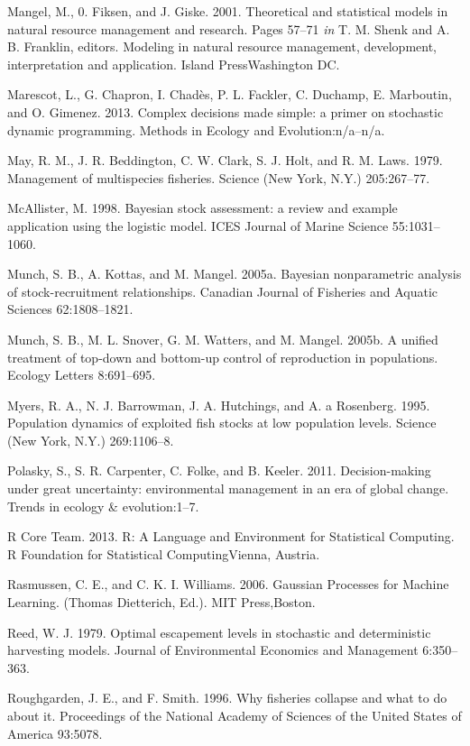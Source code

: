 \documentclass[]{components/elsarticle}
\begin{document}
Mangel, M., 0. Fiksen, and J. Giske. 2001. Theoretical and statistical
models in natural resource management and research. Pages 57--71
\emph{in} T. M. Shenk and A. B. Franklin, editors. Modeling in natural
resource management, development, interpretation and application. Island
PressWashington DC.

Marescot, L., G. Chapron, I. Chadès, P. L. Fackler, C. Duchamp, E.
Marboutin, and O. Gimenez. 2013. Complex decisions made simple: a primer
on stochastic dynamic programming. Methods in Ecology and
Evolution:n/a--n/a.

May, R. M., J. R. Beddington, C. W. Clark, S. J. Holt, and R. M. Laws.
1979. Management of multispecies fisheries. Science (New York, N.Y.)
205:267--77.

McAllister, M. 1998. Bayesian stock assessment: a review and example
application using the logistic model. ICES Journal of Marine Science
55:1031--1060.

Munch, S. B., A. Kottas, and M. Mangel. 2005a. Bayesian nonparametric
analysis of stock-recruitment relationships. Canadian Journal of
Fisheries and Aquatic Sciences 62:1808--1821.

Munch, S. B., M. L. Snover, G. M. Watters, and M. Mangel. 2005b. A
unified treatment of top-down and bottom-up control of reproduction in
populations. Ecology Letters 8:691--695.

Myers, R. A., N. J. Barrowman, J. A. Hutchings, and A. a Rosenberg.
1995. Population dynamics of exploited fish stocks at low population
levels. Science (New York, N.Y.) 269:1106--8.

Polasky, S., S. R. Carpenter, C. Folke, and B. Keeler. 2011.
Decision-making under great uncertainty: environmental management in an
era of global change. Trends in ecology \& evolution:1--7.

R Core Team. 2013. R: A Language and Environment for Statistical
Computing. R Foundation for Statistical ComputingVienna, Austria.

Rasmussen, C. E., and C. K. I. Williams. 2006. Gaussian Processes for
Machine Learning. (Thomas Dietterich, Ed.). MIT Press,Boston.

Reed, W. J. 1979. Optimal escapement levels in stochastic and
deterministic harvesting models. Journal of Environmental Economics and
Management 6:350--363.

Roughgarden, J. E., and F. Smith. 1996. Why fisheries collapse and what
to do about it. Proceedings of the National Academy of Sciences of the
United States of America 93:5078.
\end{document}
